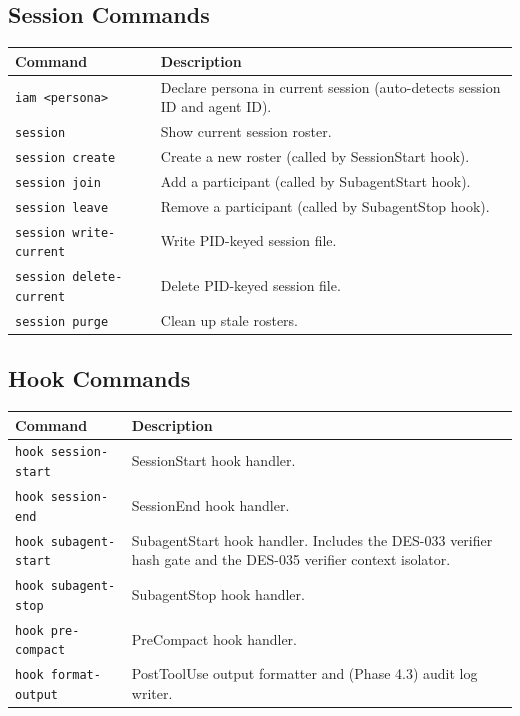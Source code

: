 \documentclass[a4paper,10pt]{article}
\newcommand{\cmd}[1]{\texttt{#1}}
\begin{document}
\subsection{Session Commands}

\begin{center}
\begin{tabular}{@{}lp{6.5cm}@{}}
\toprule
\textbf{Command} & \textbf{Description} \\
\midrule
\cmd{iam <persona>}            & Declare persona in current session
                                 (auto-detects session ID and agent
                                 ID). \\
\cmd{session}                  & Show current session roster. \\
\cmd{session create}           & Create a new roster (called by
                                 SessionStart hook). \\
\cmd{session join}             & Add a participant (called by
                                 SubagentStart hook). \\
\cmd{session leave}            & Remove a participant (called by
                                 SubagentStop hook). \\
\cmd{session write-current}    & Write PID-keyed session file. \\
\cmd{session delete-current}   & Delete PID-keyed session file. \\
\cmd{session purge}            & Clean up stale rosters. \\
\bottomrule
\end{tabular}
\end{center}

\subsection{Hook Commands}

\begin{center}
\begin{tabular}{@{}lp{6.5cm}@{}}
\toprule
\textbf{Command} & \textbf{Description} \\
\midrule
\cmd{hook session-start}    & SessionStart hook handler. \\
\cmd{hook session-end}      & SessionEnd hook handler. \\
\cmd{hook subagent-start}   & SubagentStart hook handler.
                              Includes the DES-033 verifier hash
                              gate and the DES-035 verifier
                              context isolator. \\
\cmd{hook subagent-stop}    & SubagentStop hook handler. \\
\cmd{hook pre-compact}      & PreCompact hook handler. \\
\cmd{hook format-output}    & PostToolUse output formatter and
                              (Phase 4.3) audit log writer. \\
\bottomrule
\end{tabular}
\end{center}
\end{document}
